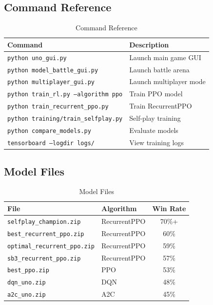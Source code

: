 \documentclass[12pt,a4paper]{article}
\begin{document}
\subsection*{Command Reference}
\begin{table}[H]
\centering
\begin{tabular}{lp{8cm}}
\toprule
\textbf{Command} & \textbf{Description} \\
\midrule
\texttt{python uno\_gui.py} & Launch main game GUI \\
\texttt{python model\_battle\_gui.py} & Launch battle arena \\
\texttt{python multiplayer\_gui.py} & Launch multiplayer mode \\
\texttt{python train\_rl.py --algorithm ppo} & Train PPO model \\
\texttt{python train\_recurrent\_ppo.py} & Train RecurrentPPO \\
\texttt{python training/train\_selfplay.py} & Self-play training \\
\texttt{python compare\_models.py} & Evaluate models \\
\texttt{tensorboard --logdir logs/} & View training logs \\
\bottomrule
\end{tabular}
\caption{Command Reference}
\label{tab:commands}
\end{table}
\subsection*{Model Files}
\begin{table}[H]
\centering
\begin{tabular}{llc}
\toprule
\textbf{File} & \textbf{Algorithm} & \textbf{Win Rate} \\
\midrule
\texttt{selfplay\_champion.zip} & RecurrentPPO & 70\%+ \\
\texttt{best\_recurrent\_ppo.zip} & RecurrentPPO & 60\% \\
\texttt{optimal\_recurrent\_ppo.zip} & RecurrentPPO & 59\% \\
\texttt{sb3\_recurrent\_ppo.zip} & RecurrentPPO & 57\% \\
\texttt{best\_ppo.zip} & PPO & 53\% \\
\texttt{dqn\_uno.zip} & DQN & 48\% \\
\texttt{a2c\_uno.zip} & A2C & 45\% \\
\bottomrule
\end{tabular}
\caption{Model Files}
\label{tab:model_files}
\end{table}
\newpage
\end{document}
